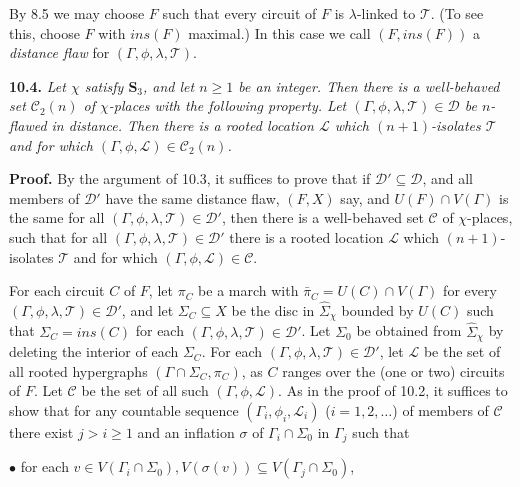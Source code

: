 By 8.5 we may choose $F$ such that every circuit of $F$ is $\lambda$-linked to $\mathscr{T}$. (To see this, choose $F$ with $ins(F)$ maximal.) In this case we call $(F, ins(F))$ a \textit{distance flaw} for $(\Gamma, \phi, \lambda, \mathscr{T})$.

\textbf{10.4.} \textit{Let $\chi$ satisfy $\mathbf{S}_3$, and let $n \ge 1$ be an integer. Then there is a well-behaved set $\mathscr{C}_2(n)$ of $\chi$-places with the following property. Let $(\Gamma, \phi, \lambda, \mathscr{T}) \in \mathscr{D}$ be $n$-flawed in distance. Then there is a rooted location $\mathscr{L}$ which $(n + 1)$-isolates $\mathscr{T}$ and for which $(\Gamma, \phi, \mathscr{L}) \in \mathscr{C}_2(n)$.}

\textbf{Proof.} By the argument of 10.3, it suffices to prove that if $\mathscr{D}' \subseteq \mathscr{D}$, and all members of $\mathscr{D}'$ have the same distance flaw, $(F, X)$ say, and $U(F) \cap V(\Gamma)$ is the same for all $(\Gamma, \phi, \lambda, \mathscr{T}) \in \mathscr{D}'$, then there is a well-behaved set $\mathscr{C}$ of $\chi$-places, such that for all $(\Gamma, \phi, \lambda, \mathscr{T}) \in \mathscr{D}'$ there is a rooted location $\mathscr{L}$ which $(n + 1)$-isolates $\mathscr{T}$ and for which $(\Gamma, \phi, \mathscr{L}) \in \mathscr{C}$.

For each circuit $C$ of $F$, let $\pi_C$ be a march with $\bar{\pi}_C = U(C) \cap V(\Gamma)$ for every $(\Gamma, \phi, \lambda, \mathscr{T}) \in \mathscr{D}'$, and let $\Sigma_C \subseteq X$ be the disc in $\hat{\Sigma}_\chi$ bounded by $U(C)$ such that $\Sigma_C = ins(C)$ for each $(\Gamma, \phi, \lambda, \mathscr{T}) \in \mathscr{D}'$. Let $\Sigma_0$ be obtained from $\hat{\Sigma}_\chi$ by deleting the interior of each $\Sigma_C$. For each $(\Gamma, \phi, \lambda, \mathscr{T}) \in \mathscr{D}'$, let $\mathscr{L}$ be the set of all rooted hypergraphs $(\Gamma \cap \Sigma_C, \pi_C)$, as $C$ ranges over the (one or two) circuits of $F$. Let $\mathscr{C}$ be the set of all such $(\Gamma, \phi, \mathscr{L})$. As in the proof of 10.2, it suffices to show that for any countable sequence $(\Gamma_i, \phi_i, \mathscr{L}_i)$ ($i = 1, 2, \dots$) of members of $\mathscr{C}$ there exist $j > i \ge 1$ and an inflation $\sigma$ of $\Gamma_i \cap \Sigma_0$ in $\Gamma_j$ such that

\hspace*{12pt}$\bullet$ for each $v \in V(\Gamma_i \cap \Sigma_0), V(\sigma(v)) \subseteq V(\Gamma_j \cap \Sigma_0)$,

